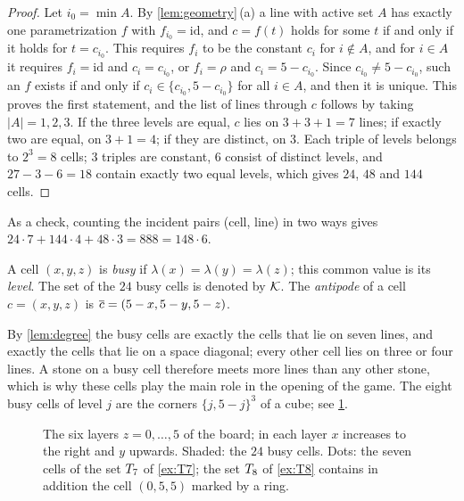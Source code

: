 \begin{proof}
Let $i_0=\min A$. By \cref{lem:geometry}\,(a) a line with active set $A$ has exactly one parametrization
$f$ with $f_{i_0}=\mathrm{id}$, and $c=f(t)$ holds for some $t$ if and only if it holds for $t=c_{i_0}$.
This requires $f_i$ to be the constant $c_i$ for $i\notin A$, and for $i\in A$ it requires
$f_i=\mathrm{id}$ and $c_i=c_{i_0}$, or $f_i=\rho$ and $c_i=5-c_{i_0}$. Since $c_{i_0}\ne 5-c_{i_0}$, such
an $f$ exists if and only if $c_i\in\{c_{i_0},5-c_{i_0}\}$ for all $i\in A$, and then it is unique. This
proves the first statement, and the list of lines through $c$ follows by taking $|A|=1,2,3$. If the three
levels are equal, $c$ lies on $3+3+1=7$ lines; if exactly two are equal, on $3+1=4$; if they are distinct,
on $3$. Each triple of levels belongs to $2^3=8$ cells; $3$ triples are constant, $6$ consist of distinct
levels, and $27-3-6=18$ contain exactly two equal levels, which gives $24$, $48$ and $144$ cells.
\end{proof}

As a check, counting the incident pairs (cell, line) in two ways gives
$24\cdot 7+144\cdot 4+48\cdot 3=888=148\cdot 6$.

\begin{definition}\label{def:busy}
A cell $(x,y,z)$ is \emph{busy} if $\lambda(x)=\lambda(y)=\lambda(z)$; this common value is its \emph{level}.
The set of the $24$ busy cells is denoted by $\mathcal{K}$. The \emph{antipode} of a cell $c=(x,y,z)$ is
$\overline{c}=(5-x,5-y,5-z)$.
\end{definition}

By \cref{lem:degree} the busy cells are exactly the cells that lie on seven lines, and exactly the cells
that lie on a space diagonal; every other cell lies on three or four lines. A stone on a busy cell
therefore meets more lines than any other stone, which is why these cells play the main role in the
opening of the game. The eight busy cells of level $j$ are the corners $\{j,5-j\}^3$ of a cube; see
\cref{fig:busy}.

\begin{figure}[t]
\centering
{}
\caption{The six layers $z=0,\dots,5$ of the board; in each layer $x$ increases to the right and $y$
upwards. Shaded: the $24$ busy cells. Dots: the seven cells of the set $T_7$ of \cref{ex:T7};
the set $T_8$ of \cref{ex:T8} contains in addition the cell $(0,5,5)$ marked by a ring.}
\label{fig:busy}
\end{figure}

